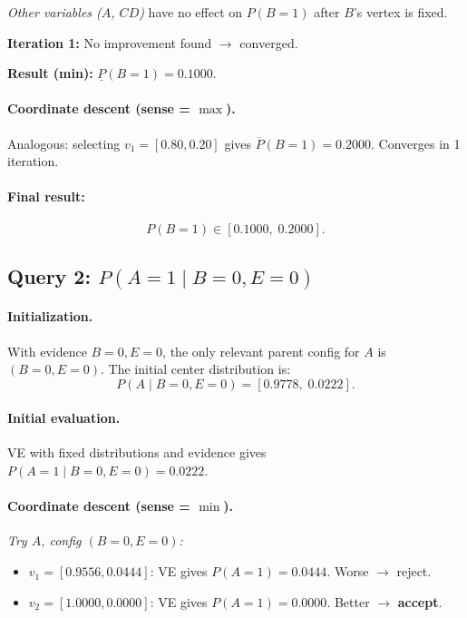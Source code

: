 \documentclass{article}
\begin{document}
\emph{Other variables ($A$, $CD$)} have no effect on $P(B{=}1)$ after $B$'s vertex is fixed.

\textbf{Iteration 1:} No improvement found $\to$ converged.

\textbf{Result (min):} $\underline{P}(B{=}1) = 0.1000$.

\paragraph{Coordinate descent (sense = $\max$).}
Analogous: selecting $v_1 = [0.80, 0.20]$ gives $\overline{P}(B{=}1) = 0.2000$.
Converges in 1 iteration.

\paragraph{Final result:}
\[
  \boxed{P(B{=}1) \in [0.1000,\; 0.2000].}
\]

\subsection{Query 2: $P(A{=}1 \mid B{=}0, E{=}0)$}

\paragraph{Initialization.}
With evidence $B{=}0, E{=}0$, the only relevant parent config for $A$ is $(B{=}0, E{=}0)$.
The initial center distribution is:
\[
  P(A \mid B{=}0, E{=}0) = [0.9778,\; 0.0222].
\]

\paragraph{Initial evaluation.}
VE with fixed distributions and evidence gives $P(A{=}1 \mid B{=}0, E{=}0) = 0.0222$.

\paragraph{Coordinate descent (sense = $\min$).}

\emph{Try $A$, config $(B{=}0, E{=}0)$:}
\begin{itemize}
  \item $v_1 = [0.9556, 0.0444]$: VE gives $P(A{=}1) = 0.0444$. Worse $\to$ reject.
  \item $v_2 = [1.0000, 0.0000]$: VE gives $P(A{=}1) = 0.0000$. Better $\to$ \textbf{accept}.
\end{itemize}
\end{document}
